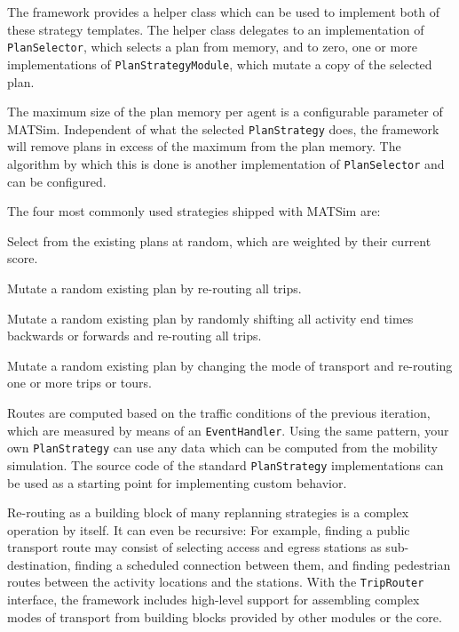 The framework provides a helper class which can be used to implement both of these strategy templates. 
The helper class delegates to an implementation of \lstinline$PlanSelector$, which selects a plan from memory, 
and to zero, one or more implementations of \lstinline$PlanStrategyModule$, which mutate a copy of the selected plan.

The maximum size of the plan memory per agent is a configurable parameter of MATSim. Independent
 of what the selected \lstinline$PlanStrategy$ does, the framework will remove plans in excess
 of the maximum from the plan memory. The algorithm by which this is done is another implementation
 of \lstinline$PlanSelector$ and can be configured. 

The four most commonly used strategies shipped with MATSim are:
\begin{compactitem}
\item Select from the existing plans at random, which are weighted by their current score.
\item Mutate a random existing plan by re-routing all trips.
\item Mutate a random existing plan by randomly shifting all activity end times backwards or forwards and re-routing 
all trips.
\item Mutate a random existing plan by changing the mode of transport and re-routing one or more trips or tours.
\end{compactitem}

Routes are computed based on the traffic conditions of the previous iteration, which are measured
by means of an \lstinline$EventHandler$. Using the same pattern, your own \lstinline$PlanStrategy$ can use any data which
can be computed from the mobility simulation. The source code of the standard \lstinline$PlanStrategy$ implementations can be 
used as a starting point for implementing custom behavior.

Re-routing as a building block of many replanning strategies is a complex operation by itself. It can
even be recursive: For example, finding a public transport route may consist of selecting access and egress stations as
sub-destination, finding a scheduled connection between them, and finding pedestrian routes between the
activity locations and the stations. With the \lstinline$TripRouter$ interface, the framework includes high-level 
support for assembling complex modes of transport from building blocks provided by other modules or the core. 
  

